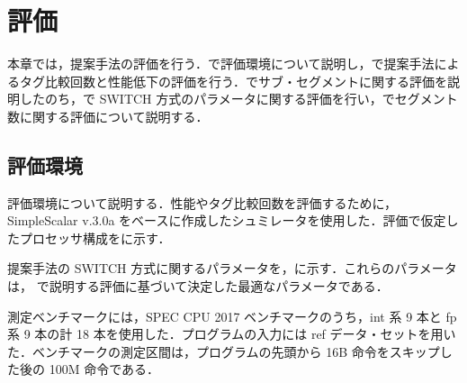 
\chapter{評価}
\label{sec:eval}
本章では，提案手法の評価を行う．で評価環境について説明し，で提案手法によるタグ比較回数と性能低下の評価を行う．でサブ・セグメントに関する評価を説明したのち，で SWITCH 方式のパラメータに関する評価を行い，でセグメント数に関する評価について説明する．

\section{評価環境}
\label{sec:eval_env}
評価環境について説明する．性能やタグ比較回数を評価するために，SimpleScalar v.3.0a をベースに作成したシュミレータを使用した．評価で仮定したプロセッサ構成をに示す．

提案手法の SWITCH 方式に関するパラメータを，に示す．これらのパラメータは， で説明する評価に基づいて決定した最適なパラメータである．

測定ベンチマークには，SPEC CPU 2017 ベンチマークのうち，int 系 9 本と fp 系 9 本の計 18 本を使用した．プログラムの入力には ref データ・セットを用いた．ベンチマークの測定区間は，プログラムの先頭から 16B 命令をスキップした後の 100M 命令である．

